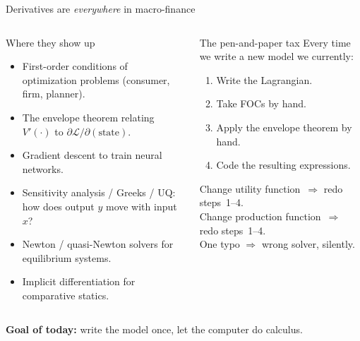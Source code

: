 \documentclass[aspectratio=169,11pt]{beamer}
\newcommand{\emphc}[1]{\textcolor{harvardcrimson}{#1}}
\begin{document}
\begin{frame}[shrink=22]{Derivatives are \emph{everywhere} in macro-finance}
\begin{columns}[t]
\begin{block}{Where they show up}
\small
\begin{itemize}\itemsep3pt
  \item \emphc{First-order conditions} of optimization problems (consumer, firm, planner).
  \item The \emphc{envelope theorem} relating $V'(\cdot)$ to $\partial \mathcal{L}/\partial (\text{state})$.
  \item \emphc{Gradient descent} to train neural networks.
  \item \emphc{Sensitivity analysis / Greeks / UQ}: how does output $y$ move with input $x$?
  \item \emphc{Newton / quasi-Newton} solvers for equilibrium systems.
  \item \emphc{Implicit differentiation} for comparative statics.
\end{itemize}
\end{block}

\begin{alertblock}{The pen-and-paper tax}
\small
Every time we write a new model we currently:
\begin{enumerate}\itemsep2pt
  \item Write the Lagrangian.
  \item Take FOCs by hand.
  \item Apply the envelope theorem by hand.
  \item Code the resulting expressions.
\end{enumerate}
Change utility function~$\Rightarrow$ redo steps~1--4.\\
Change production function~$\Rightarrow$ redo steps~1--4.\\
One typo $\Rightarrow$ wrong solver, silently.
\end{alertblock}
\end{columns}
\vspace{4pt}
\centerline{\emphc{\textbf{Goal of today:}} write the model once, let the computer do calculus.}
\end{frame}
\end{document}
